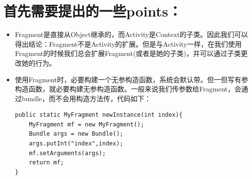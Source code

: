 \documentclass[9pt, b5paaper]{book}
\begin{document}
\section{首先需要提出的一些points：}
\label{sec-2-1}
\begin{itemize}
\item Fragment是直接从Object继承的，而Activity是Context的子类。因此我们可以得出结论：Fragment不是Activity的扩展。但是与Activity一样，在我们使用Fragment的时候我们总会扩展Fragment(或者是她的子类)，并可以通过子类更改她的行为。
\item 使用Fragment时，必要构建一个无参构造函数，系统会默认带。但一但写有参构造函数，就必要构建无参构造函数。一般来说我们传参数给Fragment，会通过bundle，而不会用构造方法传，代码如下：
\begin{verbatim}
public static MyFragment newInstance(int index){  
    MyFragment mf = new MyFragment();  
    Bundle args = new Bundle();  
    args.putInt("index",index);  
    mf.setArguments(args);  
    return mf;  
}
\end{verbatim}
\end{itemize}
\end{document}
